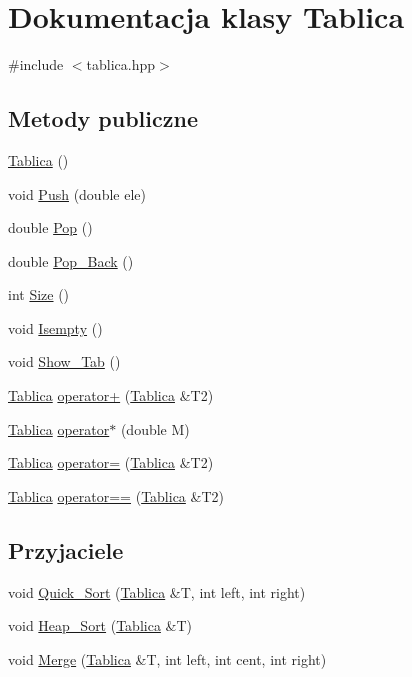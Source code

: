 \hypertarget{class_tablica}{\section{Dokumentacja klasy Tablica}
\label{class_tablica}
}


{\ttfamily \#include $<$tablica.\-hpp$>$}

\subsection*{Metody publiczne}
\begin{DoxyCompactItemize}
\item 
\hyperlink{class_tablica_a5f484e7b0478e1ff9b62e894f9d7b28d}{Tablica} ()
\item 
void \hyperlink{class_tablica_ae1af903a66629cd0d522eb9f2fd13116}{Push} (double ele)
\item 
double \hyperlink{class_tablica_a6153881ffda3f5361c2d664622a4eff4}{Pop} ()
\item 
double \hyperlink{class_tablica_a899c8e69cb97bd027c1c05140cd304ec}{Pop\-\_\-\-Back} ()
\item 
int \hyperlink{class_tablica_a8598f952095406441bfd2d20e76f175c}{Size} ()
\item 
void \hyperlink{class_tablica_a08b59415756d2dc7da781124809d8eb4}{Isempty} ()
\item 
void \hyperlink{class_tablica_a06c551a7e0220dde2f29cce06fb96209}{Show\-\_\-\-Tab} ()
\item 
\hyperlink{class_tablica}{Tablica} \hyperlink{class_tablica_a15c072e7160bfbdbc5d103cf0ebd6e76}{operator+} (\hyperlink{class_tablica}{Tablica} \&T2)
\item 
\hyperlink{class_tablica}{Tablica} \hyperlink{class_tablica_acabfd453d919950051b8a9cf4aac642e}{operator$\ast$} (double M)
\item 
\hyperlink{class_tablica}{Tablica} \hyperlink{class_tablica_a53bd7c9853f01a78ba2aff61ece4ccbf}{operator=} (\hyperlink{class_tablica}{Tablica} \&T2)
\item 
\hyperlink{class_tablica}{Tablica} \hyperlink{class_tablica_ae5d9fdf31df882eae683abc89fec01ad}{operator==} (\hyperlink{class_tablica}{Tablica} \&T2)
\end{DoxyCompactItemize}
\subsection*{Przyjaciele}
\begin{DoxyCompactItemize}
\item 
void \hyperlink{class_tablica_a17e08e601d94bc6fce93c91bd574e717}{Quick\-\_\-\-Sort} (\hyperlink{class_tablica}{Tablica} \&T, int left, int right)
\item 
void \hyperlink{class_tablica_a7ac406a30a3a7a46d498f05bb173809c}{Heap\-\_\-\-Sort} (\hyperlink{class_tablica}{Tablica} \&T)
\item 
void \hyperlink{class_tablica_ae6edf270c00af312bbafffc1955450cc}{Merge} (\hyperlink{class_tablica}{Tablica} \&T, int left, int cent, int right)
\end{DoxyCompactItemize}


